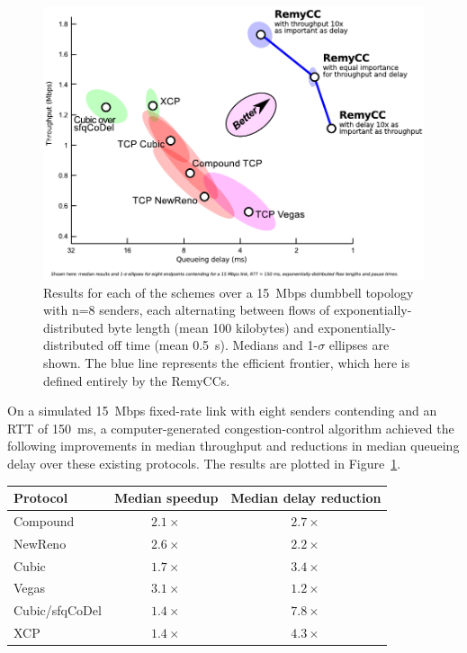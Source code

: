 \documentclass{article}
\begin{document}
\begin{figure}
\begin{centering}
\includegraphics[width=8 cm]{remy-hero-chart-convert2.pdf}
\caption{Results for each of the schemes over a 15~Mbps dumbbell
topology with n=8 senders, each alternating between flows
of exponentially-distributed byte length (mean 100 kilobytes)
and exponentially-distributed off time (mean 0.5~s). Medians
and 1-$\sigma$ ellipses are shown. The blue line represents the efficient
frontier, which here is defined entirely by the RemyCCs.}
\label{f:remy-fig4}
\end{centering}
\end{figure}

On a simulated 15~Mbps fixed-rate link with eight senders contending
and an RTT of 150~ms, a computer-generated congestion-control
algorithm achieved the following improvements in median throughput and
reductions in median queueing delay over these existing protocols. The
results are plotted in Figure~\ref{f:remy-fig4}.

\vspace{\baselineskip}

\begin{centering}
{\footnotesize
\begin{tabular}{|l|c|c|}
\hline
Protocol & Median speedup & Median delay reduction \\
\hline
\hline
Compound & $2.1\times$ & $2.7\times$ \\
NewReno & $2.6\times$ & $2.2\times$ \\
Cubic & $1.7\times$ & $3.4\times$ \\
Vegas & $3.1\times$ & $1.2\times$ \\
\hline
Cubic/sfqCoDel & $1.4\times$ & $7.8\times$ \\
XCP & $1.4\times$ & $4.3\times$ \\
\hline
\end{tabular}
}

\end{centering}
\end{document}
